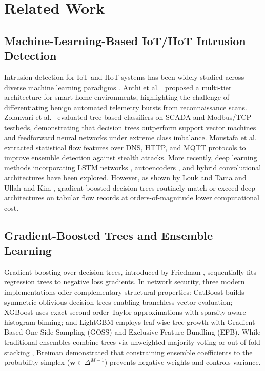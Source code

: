 \documentclass[10pt,journal,twocolumn]{IEEEtran}
\begin{document}
\section{Related Work}

\subsection{Machine-Learning-Based IoT/IIoT Intrusion Detection}
Intrusion detection for IoT and IIoT systems has been widely studied across diverse machine learning paradigms \cite{ref8,ref26}. Anthi et al.\ \cite{ref4} proposed a multi-tier architecture for smart-home environments, highlighting the challenge of differentiating benign automated telemetry bursts from reconnaissance scans. Zolanvari et al.\ \cite{ref3} evaluated tree-based classifiers on SCADA and Modbus/TCP testbeds, demonstrating that decision trees outperform support vector machines and feedforward neural networks under extreme class imbalance. Moustafa et al.\ \cite{ref5} extracted statistical flow features over DNS, HTTP, and MQTT protocols to improve ensemble detection against stealth attacks. More recently, deep learning methods incorporating LSTM networks \cite{ref23}, autoencoders \cite{ref25}, and hybrid convolutional architectures \cite{ref30} have been explored. However, as shown by Louk and Tama \cite{ref9} and Ullah and Kim \cite{ref29}, gradient-boosted decision trees routinely match or exceed deep architectures on tabular flow records at orders-of-magnitude lower computational cost.

\subsection{Gradient-Boosted Trees and Ensemble Learning}
Gradient boosting over decision trees, introduced by Friedman \cite{ref11}, sequentially fits regression trees to negative loss gradients. In network security, three modern implementations offer complementary structural properties: CatBoost \cite{ref9} builds symmetric oblivious decision trees enabling branchless vector evaluation; XGBoost \cite{ref11} uses exact second-order Taylor approximations with sparsity-aware histogram binning; and LightGBM \cite{ref29} employs leaf-wise tree growth with Gradient-Based One-Side Sampling (GOSS) and Exclusive Feature Bundling (EFB). While traditional ensembles combine trees via unweighted majority voting or out-of-fold stacking \cite{ref14}, Breiman \cite{ref15} demonstrated that constraining ensemble coefficients to the probability simplex ($\mathbf{w} \in \Delta^{M-1}$) prevents negative weights and controls variance.
\end{document}
